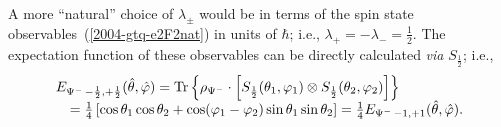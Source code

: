 {A more ``natural'' choice of $\lambda_\pm$ would be in terms of the spin state observables~(\ref{2004-gtq-e2F2nat}) in units of $\hbar$;
i.e., $  \lambda_+ = -  \lambda_- =\frac{1}{2}$.
The expectation function of  these observables can be directly calculated {\it via} $S_{\frac{1}{2}}$; i.e.,
\begin{equation}
\begin{array}{l}
E_{{ {\Psi^-}}\,-\frac{1}{2},+ \frac{1}{2} } ({\hat \theta},{\hat \varphi} )=
{\rm Tr}\left\{ \rho_{ {\Psi^-}} \cdot \left[ S_{\frac{1}{2}}(\theta_1,\varphi_1) \otimes S_{\frac{1}{2}}(\theta_2,\varphi_2)\right]\right\} \\
\quad =
\frac{1}{4} \left[\cos
    \theta_1  \cos  \theta_2 +\cos ( \varphi_1 - \varphi_2 ) \sin \theta_1  \sin  \theta_2 \right]
= \frac{1}{4}E_{{ {\Psi^-}}\,-1 ,+1 } ({\hat \theta},{\hat \varphi} )
.
\label{2009-gtq-sso2}
\end{array}
\end{equation}


\eexample
}








